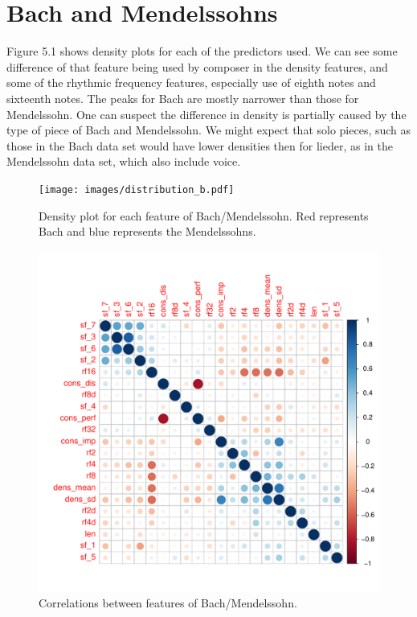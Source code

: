 \documentclass[12pt,twoside]{reedthesis}
\theoremstyle{definition}
\theoremstyle{definition}
\theoremstyle{definition}
\theoremstyle{remark}
\begin{document}
\section{Bach and Mendelssohns}\label{bach-and-mendelssohns}

Figure 5.1 shows density plots for each of the predictors used. We can
see some difference of that feature being used by composer in the
density features, and some of the rhythmic frequency features,
especially use of eighth notes and sixteenth notes. The peaks for Bach
are mostly narrower than those for Mendelssohn. One can suspect the
difference in density is partially caused by the type of piece of Bach
and Mendelssohn. We might expect that solo pieces, such as those in the
Bach data set would have lower densities then for lieder, as in the
Mendelssohn data set, which also include voice.
\begin{figure}[H]
\centering
\texttt{[image: images/distribution\_b.pdf]}
\caption{Density plot for each feature of Bach/Mendelssohn. Red represents Bach and blue represents the Mendelssohns.}
\label{subd}
\end{figure}
\begin{figure}[H]
\centering
\includegraphics[scale = .7]{images/cor_circles_b.pdf}
\caption{Correlations between features of Bach/Mendelssohn.}
\label{subd}
\end{figure}
\end{document}
